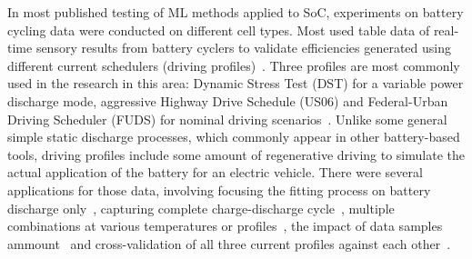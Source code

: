 %
In most published testing of ML methods applied to SoC, experiments on battery cycling data were conducted on different cell types.
Most used table data of real-time sensory results from battery cyclers to validate efficiencies generated using different current schedulers (driving profiles)~\cite{Chemali2017,song_lithium-ion_2018,mamo_long_2020,xiao_accurate_2019}.
Three profiles are most commonly used in the research in this area: Dynamic Stress Test (DST) for a variable power discharge mode, aggressive Highway Drive Schedule (US06) and Federal-Urban Driving Scheduler (FUDS) for nominal driving scenarios~\cite{xiao_accurate_2019,javid_adaptive_2020,mamo_long_2020}.
Unlike some general simple static discharge processes, which commonly appear in other battery-based tools, driving profiles include some amount of regenerative driving to simulate the actual application of the battery for an electric vehicle.
There were several applications for those data, involving focusing the fitting process on battery discharge only~\cite{song_lithium-ion_2018,mamo_long_2020,jiao_gru-rnn_2020,javid_adaptive_2020}, capturing complete charge-discharge cycle~\cite{Chemali2017}, multiple combinations at various temperatures or profiles~\cite{xiao_accurate_2019,mamo_long_2020,Chemali2017,javid_adaptive_2020}, the impact of data samples ammount~\cite{song_lithium-ion_2018} and cross-validation of all three current profiles against each other~\cite{mamo_long_2020}.
%
%
